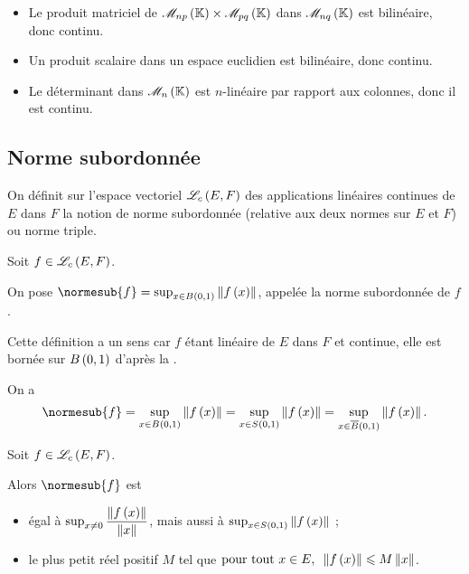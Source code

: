 \begin{ex}
\begin{itemize}
    \item Le produit matriciel de \(\M{np}\times\M{pq}\) dans \(\M{nq}\) est bilinéaire, donc continu. \\
    \item Un produit scalaire dans un espace euclidien est bilinéaire, donc continu. \\
    \item Le déterminant dans \(\M{n}\) est \(n\)-linéaire par rapport aux colonnes, donc il est continu.
\end{itemize}
\end{ex}

\subsection{Norme subordonnée}

On définit sur l'espace vectoriel \(\mathscr{L}_c\left(E,F\right)\) des applications linéaires continues de \(E\) dans \(F\) la notion de norme subordonnée (relative aux deux normes sur \(E\) et \(F\)) ou norme triple.

\begin{defi}
Soit \(f\in\mathscr{L}_c\left(E,F\right)\).

On pose \(\normesub{f}=\sup_{x\in\bouleo{0}{1}}\norme{f\paren{x}}\), appelée la norme subordonnée de \(f\).
\end{defi}

\begin{rem}
Cette définition a un sens car \(f\) étant linéaire de \(E\) dans \(F\) et continue, elle est bornée sur \(\bouleo{0}{1}\) d'après la .
\end{rem}

\begin{rem}
On a \[\normesub{f}=\sup_{x\in\bouleo{0}{1}}\norme{f\paren{x}}=\sup_{x\in\sphere{0}{1}}\norme{f\paren{x}}=\sup_{x\in\boulef{0}{1}}\norme{f\paren{x}}.\]
\end{rem}

\begin{prop}
Soit \(f\in\mathscr{L}_c\left(E,F\right)\).

Alors \(\normesub{f}\) est

\begin{itemize}
    \item égal à \(\sup_{x\not=0}\dfrac{\norme{f\paren{x}}}{\norme{x}}\), mais aussi à \(\sup_{x\in\sphere{0}{1}}\norme{f\paren{x}}\) ; \\
    \item le plus petit réel positif \(M\) tel que \(\quantifs{\tpt x\in E}\norme{f\paren{x}}\leq M\norme{x}\).
\end{itemize}
\end{prop}

